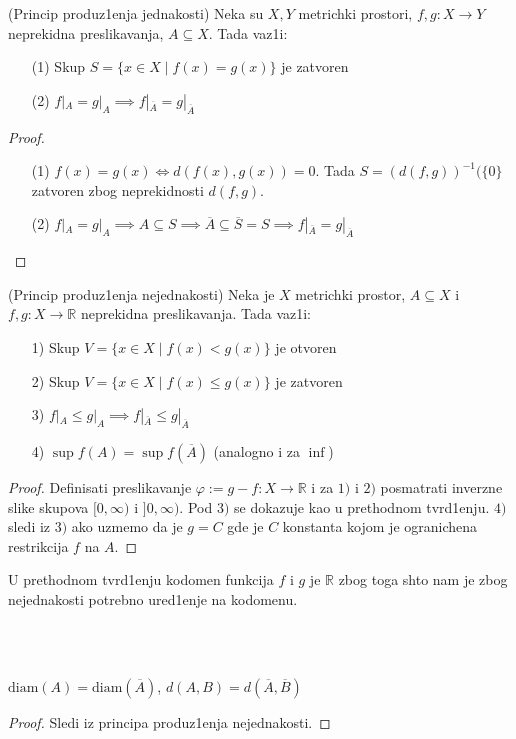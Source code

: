 \documentclass[a4paper,12pt]{article}
\newcommand{\RR}{\mathbb{R}}
\newcommand{\psj}{\subseteq}
\newcommand{\diam}{\mathrm{diam}}
\begin{document}
\begin{tvr}
(Princip produz1enja jednakosti) Neka su $X, Y$ metrichki prostori, $f,g : X \to Y$ neprekidna preslikavanja, $A \psj X$. Tada vaz1i:
\begin{itemize}
\item[(1)] Skup $S = \{x \in X \mid f(x) = g(x) \}$ je zatvoren
\item[(2)] $f|_A = g|_A \implies f|_{\overline{A}} = g|_{\overline{A}}$
\end{itemize}
\end{tvr}
\begin{proof}
\begin{itemize}
\item[(1)] $f(x) = g(x) \Leftrightarrow d(f(x), g(x)) = 0$. Tada $S = {(d(f,g))}^{-1}(\{ 0 \}$ zatvoren zbog neprekidnosti $ d(f,g)$.
\item[(2)] $f|_A = g|_A \implies A \psj S \implies \overline{A} \psj \overline{S} = S \implies f|_{\overline{A}} = g|_{\overline{A}}$
\end{itemize}
\end{proof}

\begin{tvr}
(Princip produz1enja nejednakosti) Neka je $X$ metrichki prostor, $A \psj X$ i $f,g : X \to \RR$ neprekidna preslikavanja. Tada vaz1i:
\begin{itemize}
\item[1)] Skup $V = \{x \in X \mid f(x) < g(x) \}$ je otvoren
\item[2)] Skup $V = \{x \in X \mid f(x) \leq g(x) \}$ je zatvoren
\item[3)] $f|_A \leq g|_A \implies f|_{\overline{A}} \leq g|_{\overline{A}}$
\item[4)] $\sup f(A) = \sup f(\overline{A})$ (analogno i za $\inf$)
\end{itemize}
\end{tvr}

\begin{proof}
Definisati preslikavanje $\varphi := g - f : X \to \RR$ i za $1)$ i $2)$ posmatrati inverzne slike skupova $[0, \infty)$ i $]0, \infty)$. Pod $3)$ se dokazuje kao u prethodnom tvrd1enju. $4)$ sledi iz $3)$ ako uzmemo da je $g = C$ gde je $C$ konstanta kojom je ogranichena restrikcija $f$ na $A$.
\end{proof}

\begin{nap}
U prethodnom tvrd1enju kodomen funkcija $f$ i $g$ je $\RR$ zbog toga shto nam je zbog nejednakosti potrebno ured1enje na kodomenu.
\end{nap} \\ \\
\begin{posl}
	$\diam(A) = \diam(\overline{A})$, $d(A, B) = d(\overline A, \overline B)$
\end{posl}
\begin{proof}
Sledi iz principa produz1enja nejednakosti.
\end{proof}
\end{document}
